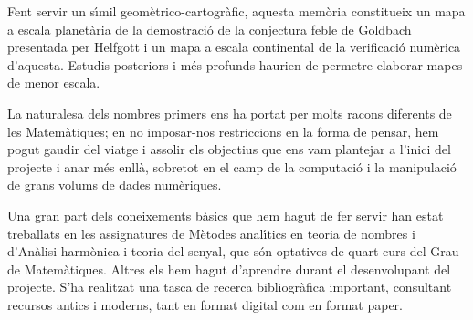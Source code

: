 \documentclass[11pt,a4paper,openright,oneside]{article}
\numberwithin{equation}{section}
\theoremstyle{definition}
\begin{document}
Fent servir un s\'{\i}mil geom\`etrico-cartogr\`afic, aquesta mem\`oria constitueix un mapa a escala planet\`aria de la demostraci\'o de la conjectura feble de Goldbach presentada per Helfgott i un mapa a escala continental de la verificaci\'o num\`erica d'aquesta. Estudis posteriors i m\'es profunds haurien de permetre elaborar mapes de menor escala.

La naturalesa dels nombres primers ens ha portat per molts racons diferents de les Matem\`atiques; en no imposar-nos restriccions en la forma de pensar, hem pogut gaudir del viatge i assolir els objectius que ens vam plantejar a l'inici del projecte i anar m\'es enll\`a, sobretot en el camp de la computaci\'o i la manipulaci\'o de grans volums de dades num\`eriques.

Una gran part dels coneixements b\`asics que hem hagut de fer servir han estat treballats en les assignatures de M\`etodes anal\'{\i}tics en teoria de nombres i d'An\`alisi harm\`onica i teoria del senyal, que s\'on optatives de quart curs del Grau de Ma\-te\-m\`a\-ti\-ques. Altres els hem hagut d'aprendre durant el desenvolupant del projecte. S'ha realitzat una tasca de recerca bibliogr\`afica important, consultant recursos antics i moderns, tant en format digital com en format paper.

\normalfont

\newpage
\end{document}
